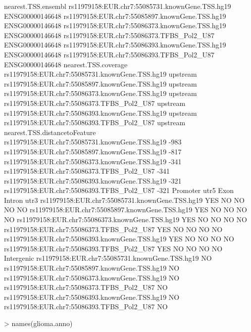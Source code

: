 \documentclass[a4paper]{article}
\begin{document}
\begin{Schunk}
\begin{Soutput}
                                                nearest.TSS.ensembl
rs11979158:EUR.chr7:55085731.knownGene.TSS.hg19     ENSG00000146648
rs11979158:EUR.chr7:55085897.knownGene.TSS.hg19     ENSG00000146648
rs11979158:EUR.chr7:55086373.knownGene.TSS.hg19     ENSG00000146648
rs11979158:EUR.chr7:55086373.TFBS_Pol2_U87          ENSG00000146648
rs11979158:EUR.chr7:55086393.knownGene.TSS.hg19     ENSG00000146648
rs11979158:EUR.chr7:55086393.TFBS_Pol2_U87          ENSG00000146648
                                                nearest.TSS.coverage
rs11979158:EUR.chr7:55085731.knownGene.TSS.hg19             upstream
rs11979158:EUR.chr7:55085897.knownGene.TSS.hg19             upstream
rs11979158:EUR.chr7:55086373.knownGene.TSS.hg19             upstream
rs11979158:EUR.chr7:55086373.TFBS_Pol2_U87                  upstream
rs11979158:EUR.chr7:55086393.knownGene.TSS.hg19             upstream
rs11979158:EUR.chr7:55086393.TFBS_Pol2_U87                  upstream
                                                nearest.TSS.distancetoFeature
rs11979158:EUR.chr7:55085731.knownGene.TSS.hg19                          -983
rs11979158:EUR.chr7:55085897.knownGene.TSS.hg19                          -817
rs11979158:EUR.chr7:55086373.knownGene.TSS.hg19                          -341
rs11979158:EUR.chr7:55086373.TFBS_Pol2_U87                               -341
rs11979158:EUR.chr7:55086393.knownGene.TSS.hg19                          -321
rs11979158:EUR.chr7:55086393.TFBS_Pol2_U87                               -321
                                                Promoter utr5 Exon Intron utr3
rs11979158:EUR.chr7:55085731.knownGene.TSS.hg19      YES   NO   NO     NO   NO
rs11979158:EUR.chr7:55085897.knownGene.TSS.hg19      YES   NO   NO     NO   NO
rs11979158:EUR.chr7:55086373.knownGene.TSS.hg19      YES   NO   NO     NO   NO
rs11979158:EUR.chr7:55086373.TFBS_Pol2_U87           YES   NO   NO     NO   NO
rs11979158:EUR.chr7:55086393.knownGene.TSS.hg19      YES   NO   NO     NO   NO
rs11979158:EUR.chr7:55086393.TFBS_Pol2_U87           YES   NO   NO     NO   NO
                                                Intergenic
rs11979158:EUR.chr7:55085731.knownGene.TSS.hg19         NO
rs11979158:EUR.chr7:55085897.knownGene.TSS.hg19         NO
rs11979158:EUR.chr7:55086373.knownGene.TSS.hg19         NO
rs11979158:EUR.chr7:55086373.TFBS_Pol2_U87              NO
rs11979158:EUR.chr7:55086393.knownGene.TSS.hg19         NO
rs11979158:EUR.chr7:55086393.TFBS_Pol2_U87              NO
\end{Soutput}
\begin{Sinput}
> names(glioma.anno)

\end{Sinput}
\end{Schunk}
\end{document}
